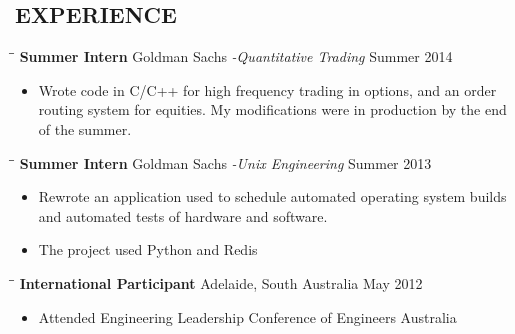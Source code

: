 \documentclass{res}
\begin{document}
\begin{resume}
\section{EXPERIENCE}
   \vspace{-0.1in}	
   \begin{tabbing}
   \hspace{1.3in}\= \hspace{3.6in}\= \kill %
    {\bf Summer Intern} \>Goldman Sachs \emph{\small{-Quantitative Trading}} \>Summer 2014\\
   \end{tabbing}\vspace{-20pt}
   \begin{itemize}
     \item Wrote code in C/C++ for high frequency trading in options, and an order routing system for equities. My modifications were in production by the end of the summer.
   \end{itemize}

   \vspace{-0.1in}	
   \begin{tabbing}
   \hspace{1.3in}\= \hspace{3.6in}\= \kill %
    {\bf Summer Intern} \>Goldman Sachs \emph{\small{-Unix Engineering}} \>Summer 2013\\
   \end{tabbing}\vspace{-20pt}
   \begin{itemize}
     \item Rewrote an application used to schedule automated operating system builds and automated tests of hardware and software.
     \item The project used Python and Redis
   \end{itemize}

   \begin{tabbing}
   \hspace{2.3in}\= \hspace{2.6in}\= \kill %
   {\bf International Participant}  \>Adelaide, South Australia \> May 2012\\
   \end{tabbing}\vspace{-20pt}
   \begin{itemize}
       \item Attended Engineering Leadership Conference of Engineers Australia
   \end{itemize}


\end{resume}
\end{document}
